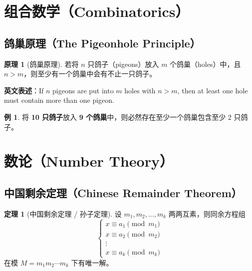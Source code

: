 \documentclass[UTF8,11pt,a4paper]{ctexbook}   %
\theoremstyle{definition}
\newtheorem{theorem}{定理}[section]
\newtheorem{example}{例}[section]
\newtheorem{principle}{原理}[section]
\begin{document}
\section{组合数学（Combinatorics）}

\subsection{鸽巢原理（The Pigeonhole Principle）}

\begin{principle}[鸽巢原理]
若将 $n$ 只鸽子（pigeons）放入 $m$ 个鸽巢（holes）中，且 $n > m$，则至少有一个鸽巢中会有不止一只鸽子。

\vspace{0.5em}
\textbf{英文表述}：If $n$ pigeons are put into $m$ holes with $n > m$, then at least one hole must contain more than one pigeon.
\end{principle}

\begin{example}
将 \textbf{10 只鸽子}放入 \textbf{9 个鸽巢}中，则必然存在至少一个鸽巢包含至少 2 只鸽子。
\end{example}

\section{数论（Number Theory）}

\subsection{中国剩余定理（Chinese Remainder Theorem）}

\begin{theorem}[中国剩余定理 / 孙子定理]
设 $m_1, m_2, \ldots, m_k$ 两两互素，则同余方程组
\[
\begin{cases}
x \equiv a_1 \pmod{m_1} \\
x \equiv a_2 \pmod{m_2} \\
\vdots \\
x \equiv a_k \pmod{m_k}
\end{cases}
\]
在模 $M = m_1 m_2 \cdots m_k$ 下有唯一解。
\end{theorem}
\end{document}
